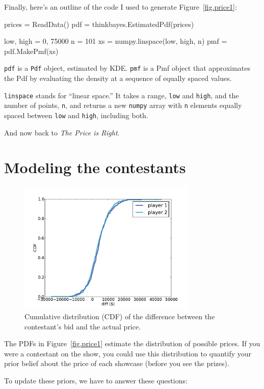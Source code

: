 \documentclass[12pt]{book}
\theoremstyle{exercise}
\begin{document}
Finally, here's an outline of the code I used to generate
Figure~\ref{fig.price1}:

\begin{code}
    prices = ReadData()
    pdf = thinkbayes.EstimatedPdf(prices)

    low, high = 0, 75000
    n = 101
    xs = numpy.linspace(low, high, n) 
    pmf = pdf.MakePmf(xs)
\end{code}

{\tt pdf} is a {\tt Pdf} object, estimated by KDE.  {\tt pmf}
is a Pmf object that approximates the Pdf by evaluating the density
at a sequence of equally spaced values.

{\tt linspace} stands for
``linear space.''  It takes a range, {\tt low} and {\tt high}, and
the number of points, {\tt n}, and returns a new {\tt numpy}
array with {\tt n} elements equally spaced between {\tt low} and
{\tt high}, including both.

And now back to {\it The Price is Right}.


\section{Modeling the contestants}

\begin{figure}
\centerline{\includegraphics[height=2.5in]{figs/price2.pdf}}
\caption{Cumulative distribution (CDF) of the difference between the
  contestant's bid and the actual price.}
\label{fig.price2}
\end{figure}

The PDFs in Figure~\ref{fig.price1} estimate the distribution of
possible prices.  If you were a contestant on the
show, you could use this distribution to quantify your prior belief
about the price of each showcase (before you see the prizes).

To update these priors, we have to answer these questions:
\end{document}
